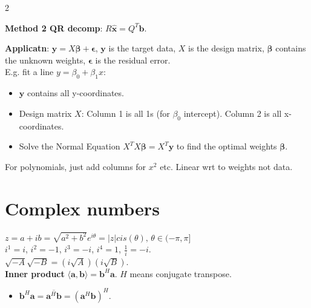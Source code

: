 \documentclass[10pt]{article}
\begin{document}
\begin{multicols*}{2}
{{\begin{itemize}
\begin{itemize}
            \end{itemize}
        \end{itemize}
        \textbf{Method 2 QR decomp}: $R\hat{\mathbf{x}} = Q^T \mathbf{b}$.
    }%
}
\textbf{Applicatn}: $\mathbf{y} = X\boldsymbol{\beta} + \boldsymbol{\epsilon}$, $\mathbf{y}$ is the target data, $X$ is the design matrix, $\boldsymbol{\beta}$ contains the unknown weights, $\boldsymbol{\epsilon}$ is the residual error.\\
E.g. fit a line $y = \beta_0 + \beta_1 x$: 
\begin{itemize}
    \item $\mathbf{y}$ contains all y-coordinates.
    \item Design matrix $X$: Column 1 is all 1s (for $\beta_0$ intercept). Column 2 is all x-coordinates.
    \item Solve the Normal Equation $X^T X\boldsymbol{\beta} = X^T \mathbf{y}$ to find the optimal weights $\boldsymbol{\beta}$.
\end{itemize}
For polynomials, just add columns for $x^2$ etc. Linear wrt to weights not data.

\section*{Complex numbers}
$z = a + ib = \sqrt{a^2 + b^2} e^{i \theta} = |z|cis(\theta),\,\theta\in(-\pi,\pi]$\\
$i^1=i$, $i^2=-1$, $i^3=-i$, $i^4=1$, $\frac{1}{i} = -i$.\\
$\sqrt{-A}\sqrt{-B} = (i\sqrt{A})(i\sqrt{B})$.\\
\textbf{Inner product} $\langle \mathbf{a}, \mathbf{b} \rangle = \mathbf{b}^H \mathbf{a}$. $H$ means conjugate transpose.
\begin{itemize}
    \item $\mathbf{b}^H \mathbf{a} = \overline{\mathbf{a}^H \mathbf{b}} = (\mathbf{a}^H \mathbf{b})^H$.
\end{itemize}
\noindent
{}


\end{multicols*}
\end{document}
